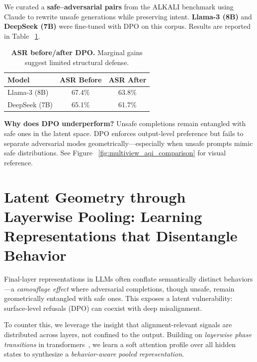 We curated a \textbf{safe–adversarial pairs} from the {\fontsize{7}{8}\selectfont ALKALI} benchmark using Claude to rewrite unsafe generations while preserving intent. \textbf{Llama-3 (8B)} and \textbf{DeepSeek (7B)} were fine-tuned with DPO on this corpus. Results are reported in Table ~\ref{tab:asr-dpo}.

\begin{table}[H]
\vspace{-2mm}
\centering
\tiny
\begin{tabular}{lcc}
\toprule
\textbf{Model} & \textbf{ASR Before} & \textbf{ASR After} \\
\midrule
Llama-3 (8B)   & 67.4\% & 63.8\% \\
DeepSeek (7B)  & 65.1\% & 61.7\% \\
\bottomrule
\end{tabular}
\vspace{-1mm}
\caption{\textbf{ASR before/after DPO.} Marginal gains suggest limited structural defense.}
\label{tab:asr-dpo}
\vspace{-2mm}
\end{table}

\vspace{-1mm}
\textbf{Why does DPO underperform?} Unsafe completions remain entangled with safe ones in the latent space. DPO enforces output-level preference but fails to separate adversarial modes geometrically—especially when unsafe prompts mimic safe distributions. See Figure ~\ref{fig:multiview_aqi_comparison} for visual reference. 


\section{Latent Geometry through Layerwise Pooling: Learning Representations that Disentangle Behavior}
\label{sec:pool_profile_main}

Final-layer representations in LLMs often conflate semantically distinct behaviors—a \textit{camouflage effect} where adversarial completions, though unsafe, remain geometrically entangled with safe ones. This exposes a latent vulnerability: surface-level refusals (DPO) can coexist with deep misalignment. 

To counter this, we leverage the insight that alignment-relevant signals are distributed across layers, not confined to the output. Building on \textit{layerwise phase transitions} in transformers~\cite{liu2023lost,belrose2023language}, we learn a soft attention profile over all hidden states to synthesize a \emph{behavior-aware pooled representation}.


